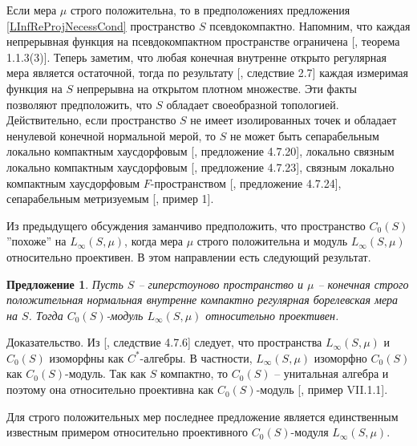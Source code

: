 \documentclass[12pt]{article}
\numberwithin{equation}{subsection}
\theoremstyle{plain}
\newtheorem{proposition}{Предложение}
\newenvironment{proof}{Доказательство.}{}
\begin{document}
\begin{fulltext}
    Если мера $\mu$ строго положительна, то в предположениях предложения \ref{LInfReProjNecessCond} пространство $S$ псевдокомпактно. Напомним, что каждая непрерывная функция на псевдокомпактном пространстве ограничена [\cite{HrusPseudCompTopSp}, теорема 1.1.3(3)]. Теперь заметим, что любая конечная внутренне открыто регулярная мера является остаточной, тогда по результату [\cite{ZindResMeasLocCompSp}, следствие 2.7] каждая измеримая функция на $S$ непрерывна на открытом плотном множестве. Эти факты позволяют предположить, что $S$ обладает своеобразной топологией. Действительно, если пространство $S$ не имеет изолированных точек и обладает ненулевой конечной нормальной мерой, то $S$ не может быть сепарабельным локально компактным хаусдорфовым [\cite{DalesBanSpContFunDualSp}, предложение 4.7.20], локально связным локально компактным хаусдорфовым [\cite{DalesBanSpContFunDualSp}, предложение 4.7.23], связным локально компактным хаусдорфовым $F$-пространством [\cite{DalesBanSpContFunDualSp}, предложение 4.7.24], сепарабельным метризуемым [\cite{FlachNormMeasTopSp}, пример 1].

    Из предыдущего обсуждения заманчиво предположить, что пространство $C_0(S)$ ''похоже'' на  $L_\infty(S,\mu)$, когда мера $\mu$ строго положительна и модуль $L_\infty(S,\mu)$ относительно проективен. В этом направлении есть следующий результат.

    \begin{proposition}\label{LInfReProjSuffCond} Пусть $S$ -- гиперстоуново пространство и $\mu$ -- конечная строго положительная нормальная внутренне компактно регулярная борелевская мера на $S$. Тогда $C_0(S)$-модуль $L_\infty(S,\mu)$ относительно проективен.
    \end{proposition}
    \begin{proof} Из [\cite{DalesBanSpContFunDualSp}, следствие 4.7.6] следует, что пространства $L_\infty(S,\mu)$ и $C_0(S)$ изоморфны как $C^*$-алгебры. В частности, $L_\infty(S,\mu)$ изоморфно $C_0(S)$ как $C_0(S)$-модуль. Так как $S$ компактно, то $C_0(S)$ -- унитальная алгебра и поэтому она относительно проективна как $C_0(S)$-модуль [\cite{HelBanLocConvAlg}, пример VII.1.1].
    \end{proof}

    Для строго положительных мер последнее предложение является единственным известным примером относительно проективного $C_0(S)$-модуля $L_\infty(S,\mu)$.

\end{fulltext}
\end{document}
